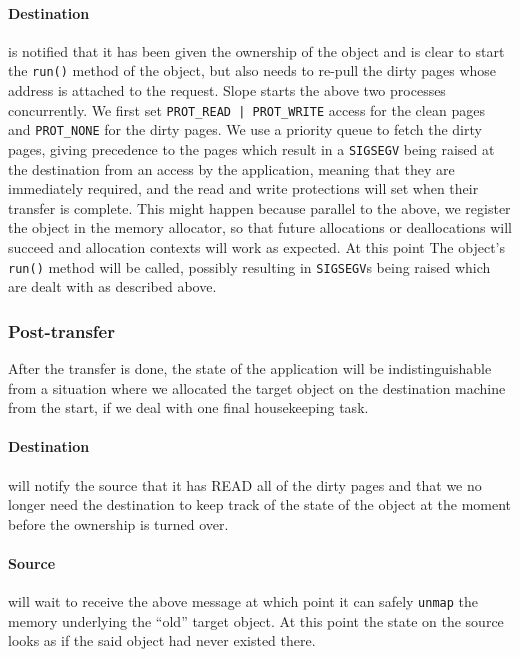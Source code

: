 \paragraph{Destination} is notified that it has been given the ownership of
the object and is clear to start the \texttt{run()} method of the object,
but also needs to re-pull the dirty pages whose address is attached to the
request.
Slope starts the above two processes concurrently. We first set 
\texttt{PROT\_READ | PROT\_WRITE} access for the clean pages and
\texttt{PROT\_NONE} for the dirty pages. We use a priority queue to fetch the
dirty pages, giving precedence to the pages which result in a
\texttt{SIGSEGV} being raised at the destination from an access by the
application, meaning that they are immediately required, and the read and write
protections will set when their transfer is complete. This might happen
because parallel to the above, we register the object
in the memory allocator, so that future allocations or deallocations will
succeed and allocation contexts will work as expected. At this point The
object's \texttt{run()} method will be called, possibly resulting in
\texttt{SIGSEGV}s being raised which are dealt with as described above.

\subsubsection{Post-transfer}
After the transfer is done, the state of the application will be
indistinguishable from a situation where we allocated the target object on
the destination machine from the start, if we deal with one final housekeeping
task.

\paragraph{Destination} will notify the source that it has READ all of the
dirty pages and that we no longer need the destination to keep track of the
state of the object at the moment before the ownership is turned over.

\paragraph{Source} will wait to receive the above message at which point it
can safely \texttt{unmap} the memory underlying the ``old'' target object. At
this point the state on the source looks as if the said object had never existed
there.


